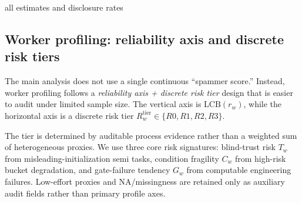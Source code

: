 \begin{algorithm}[t]
\caption{LOO reliability estimation on multi-annotated tasks}
\label{alg:loo-reliability}

\Return all estimates and disclosure rates\;
\end{algorithm}

\subsection{Worker profiling: reliability axis and discrete risk tiers}

The main analysis does not use a single continuous ``spammer score.'' Instead, worker profiling follows a
\emph{reliability axis + discrete risk tier} design that is easier to audit under limited sample size.
The vertical axis is $\mathrm{LCB}(r_w)$, while the horizontal axis is a discrete risk tier
$R_w^{\mathrm{tier}}\in\{R0,R1,R2,R3\}$.

The tier is determined by auditable process evidence rather than a weighted sum of heterogeneous proxies.
We use three core risk signatures: blind-trust risk $T_w$ from misleading-initialization semi tasks,
condition fragility $C_w$ from high-risk bucket degradation, and gate-failure tendency $G_w$ from
computable engineering failures. Low-effort proxies and NA/missingness are retained only as auxiliary audit
fields rather than primary profile axes.

